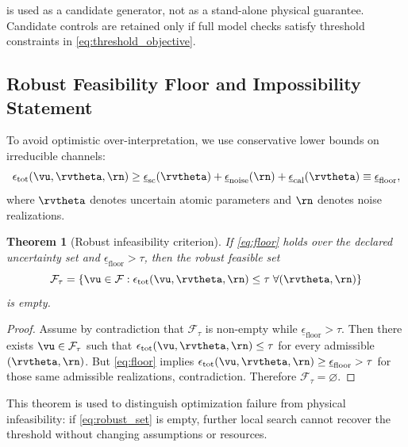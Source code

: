 \documentclass{article} %
\newtheorem{theorem}{Theorem}[section]
\begin{document}
 is used as a candidate generator, not as a stand-alone physical guarantee. Candidate controls are retained only if full model checks satisfy threshold constraints in \eqref{eq:threshold_objective}.

\subsection{Robust Feasibility Floor and Impossibility Statement}
To avoid optimistic over-interpretation, we use conservative lower bounds on irreducible channels:
\begin{equation}
\epsilon_{\mathrm{tot}}(\vu,\rvtheta,\rn)
\ge
\underline{\epsilon}_{\mathrm{sc}}(\rvtheta)+
\underline{\epsilon}_{\mathrm{noise}}(\rn)+
\underline{\epsilon}_{\mathrm{cal}}(\rvtheta)
\equiv
\underline{\epsilon}_{\mathrm{floor}},
\label{eq:floor}
\end{equation}
where $\rvtheta$ denotes uncertain atomic parameters and $\rn$ denotes noise realizations.

\begin{theorem}[Robust infeasibility criterion]
\label{thm:fc2}
If \eqref{eq:floor} holds over the declared uncertainty set and $\underline{\epsilon}_{\mathrm{floor}}>\tau$, then the robust feasible set
\begin{equation}
\mathcal{F}_{\tau}=\left\{\vu\in\mathcal{F}:\epsilon_{\mathrm{tot}}(\vu,\rvtheta,\rn)\le\tau\;\forall (\rvtheta,\rn)\right\}
\label{eq:robust_set}
\end{equation}
is empty.
\end{theorem}

\begin{proof}
Assume by contradiction that $\mathcal{F}_{\tau}$ is non-empty while $\underline{\epsilon}_{\mathrm{floor}}>\tau$. Then there exists $\vu\in\mathcal{F}_{\tau}$ such that $\epsilon_{\mathrm{tot}}(\vu,\rvtheta,\rn)\le\tau$ for every admissible $(\rvtheta,\rn)$. But \eqref{eq:floor} implies $\epsilon_{\mathrm{tot}}(\vu,\rvtheta,\rn)\ge\underline{\epsilon}_{\mathrm{floor}}>\tau$ for those same admissible realizations, contradiction. Therefore $\mathcal{F}_{\tau}=\varnothing$.\qedhere
\end{proof}

This theorem is used to distinguish optimization failure from physical infeasibility: if \eqref{eq:robust_set} is empty, further local search cannot recover the threshold without changing assumptions or resources.
\end{document}
